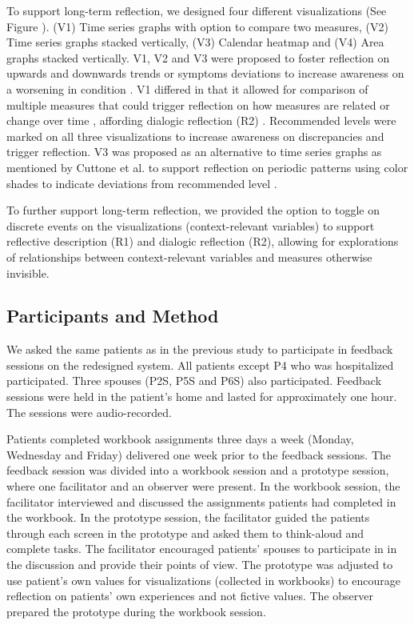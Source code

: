 To support long-term reflection, we designed four different visualizations (See Figure ). (V1) Time series graphs with option to compare two measures, (V2) Time series graphs stacked vertically, (V3) Calendar heatmap and (V4) Area graphs stacked vertically. V1, V2 and V3 were proposed to foster reflection on upwards and downwards trends or symptoms deviations to increase awareness on a worsening in condition \cite{Rivera}. V1 differed in that it allowed for comparison of multiple measures that could trigger reflection on how measures are related or change over time \cite{Cuttone}, affording dialogic reflection (R2) \cite{Fleck}. Recommended levels were marked on all three visualizations to increase awareness on discrepancies \cite{Li2010} and trigger reflection. V3 was proposed as an alternative to time series graphs as mentioned by Cuttone et al. to support reflection on periodic patterns using color shades to indicate deviations from recommended level \cite{Cuttone, Li2010}.   

To further support long-term reflection, we provided the option to toggle on discrete events on the visualizations (context-relevant variables) \cite{Sorensen} to support reflective description (R1) and dialogic reflection (R2), allowing for explorations of relationships between context-relevant variables and measures otherwise invisible.  

\subsection{Participants and Method}
We asked the same patients as in the previous study to participate in feedback sessions on the redesigned system. All patients except P4 who was hospitalized participated. Three spouses (P2S, P5S and P6S) also participated. Feedback sessions were held in the patient’s home and lasted for approximately one hour. The sessions were audio-recorded. 

Patients completed workbook assignments three days a week (Monday, Wednesday and Friday) delivered one week prior to the feedback sessions. The feedback session was divided into a workbook session and a prototype session, where one facilitator and an observer were present. In the workbook session, the facilitator interviewed and discussed the assignments patients had completed in the workbook. In the prototype session, the facilitator guided the patients through each screen in the prototype and asked them to think-aloud and complete tasks. The facilitator encouraged patients’ spouses to participate in in the discussion and provide their points of view. The prototype was adjusted to use patient’s own values for visualizations (collected in workbooks) to encourage reflection on patients’ own experiences and not fictive values. The observer prepared the prototype during the workbook session.  

